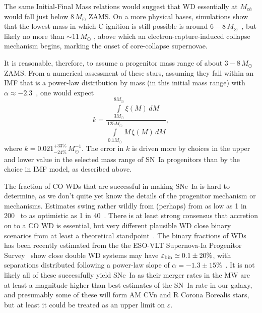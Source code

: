 \documentclass[apj]{aastex}
\begin{document}
The same Initial-Final Mass relations would suggest that WD essentially at $M_{ch}$ would fall just below $8\, M_{\odot}$ ZAMS. On a more physical bases, simulations show that the lowest mass in which C ignition is still possible is around $6-8 \,M_{\odot}$~\cite{Chen:2014rb,Denissenkov:2015rf}, but likely no more than $\sim11\, M_{\odot}$ \citep{Takahashi:2013jx}, above which an electron-capture-induced collapse mechanism begins, marking the onset of core-collapse supernovae.

It is reasonable, therefore, to assume a progenitor mass range of about $3-8\,M_{\odot}$ ZAMS. From a numerical assessment of these stars, assuming they fall within an IMF that is a power-law distribution by mass (in this initial mass range) with $\alpha\approx-2.3$~\citep{Salpeter:1955rw,Kroupa:2001gf}, one would expect 
\begin{equation}
k = \frac{\int\limits_{3M_{\odot}}^{8M_{\odot}} \xi(M)\,dM}{\int\limits_{0.1M_{\odot}}^{125M_{\odot}} M\,\xi(M)\,dM},
\end{equation}
\noindent where $k = 0.021^{+33\%}_{-24\%}\,M_{\odot}^{-1}$. The error in $k$ is driven more by choices in the upper and lower value in the selected mass range of  SN~Ia progenitors than by the choice in IMF model, as described above.

The fraction of CO WDs that are successful in making SNe~Ia is hard to determine, as we don't quite yet know the details of the progenitor mechanism or mechanisms. Estimates swing rather wildly from (perhaps) from as low as 1 in 200~\citep{Breedt:2017rp} to as optimistic as 1 in 40~\citep{Maoz:2012}. There is at least strong consensus that accretion on to a CO WD is essential, but very different plausible WD close binary scenarios from at least a theoretical standpoint~\citep{Nelemans:2001hb,Nelemans:2001cs}. The binary fractions of WDs has been recently estimated from the  the ESO-VLT Supernova-Ia Progenitor Survey~\citep[SPY]{Napiwotzki:2007} show close double WD systems may have $\varepsilon_{\rm bin}\simeq0.1\pm20\%$, with separations distributed following a power-law slope of $\alpha=-1.3\pm15\%$~\citep{Maoz:2017zl}. It is not likely all of these successfully yield SNe~Ia as their merger rates in the MW are at least a magnitude higher than best estimates of the SN~Ia rate in our galaxy, and presumably some of these will form AM CVn and R Corona Borealis stars, but at least it could be treated as an upper limit on $\varepsilon$.
\end{document}
